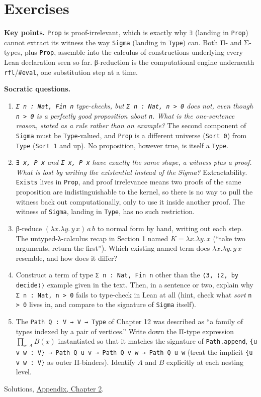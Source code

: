 \section{Exercises}\label{sec:02-terminology-and-coc:03-exercises:1}

\textbf{Key points.} \texttt{Prop} is proof-irrelevant, which is exactly why \texttt{∃} (landing in \texttt{Prop}) cannot extract its witness the way \texttt{Sigma} (landing in \texttt{Type}) can. Both Π- and Σ-types, plus \texttt{Prop}, assemble into the calculus of constructions underlying every Lean declaration seen so far. β-reduction is the computational engine underneath \texttt{rfl}/\texttt{\#eval}, one substitution step at a time.

\textbf{Socratic questions.}

\begin{enumerate}
\def\labelenumi{\arabic{enumi}.}
\item
  \emph{\texttt{Σ n : Nat, Fin n} type-checks, but \texttt{Σ n : Nat, n > 0} does not, even though \texttt{n > 0} is a perfectly good proposition about \texttt{n}. What is the one-sentence reason, stated as a rule rather than an example?} The second component of \texttt{Sigma} must be \texttt{Type}-valued, and \texttt{Prop} is a different universe (\texttt{Sort 0}) from \texttt{Type} (\texttt{Sort 1} and up). No proposition, however true, is itself a \texttt{Type}.
\item
  \emph{\texttt{∃ x, P x} and \texttt{Σ x, P x} have exactly the same shape, a witness plus a proof. What is lost by writing the existential instead of the Sigma?} Extractability. \texttt{Exists} lives in \texttt{Prop}, and proof irrelevance means two proofs of the same proposition are indistinguishable to the kernel, so there is no way to pull the witness back out computationally, only to use it inside another proof. The witness of \texttt{Sigma}, landing in \texttt{Type}, has no such restriction.
\item
  β-reduce \((\lambda x.\lambda y.\, y\, x)\, a\, b\) to normal form by hand, writing out each step. The untyped-λ-calculus recap in Section 1 named \(K = \lambda x.\lambda y.\, x\) (``take two arguments, return the first''). Which existing named term does \(\lambda x.\lambda y.\, y\, x\) resemble, and how does it differ?
\item
  Construct a term of type \texttt{Σ n : Nat, Fin n} other than the \texttt{⟨3, ⟨2, by decide⟩⟩} example given in the text. Then, in a sentence or two, explain why \texttt{Σ n : Nat, n > 0} fails to type-check in Lean at all (hint, check what \emph{sort} \texttt{n > 0} lives in, and compare to the signature of \texttt{Sigma} itself).
\item
  The \texttt{Path Q : V → V → Type} of Chapter 12 was described as ``a family of types indexed by a pair of vertices.'' Write down the Π-type expression \(\prod_{x:A} B(x)\) instantiated so that it matches the signature of \texttt{Path.append}, \texttt{\{u v w : V\} → Path Q u v → Path Q v w → Path Q u w} (treat the implicit \texttt{\{u v w : V\}} as outer Π-binders). Identify \(A\) and \(B\) explicitly at each nesting level.
\end{enumerate}

Solutions, \hyperref[sec:15-appendix-solutions:02-chapter-2:1]{Appendix, Chapter 2}.
